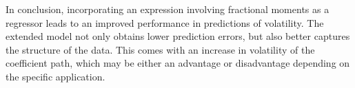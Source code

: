 In conclusion, incorporating an expression involving fractional moments as a regressor leads to an improved performance in predictions of volatility. The extended model not only obtains lower prediction errors, but also better captures the structure of the data. This comes with an increase in volatility of the coefficient path, which may be either an advantage or disadvantage depending on the specific application. 